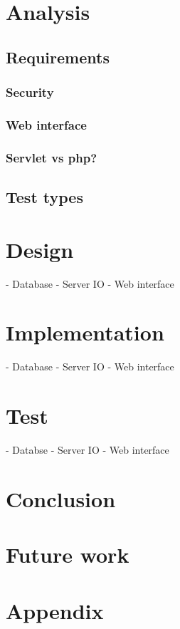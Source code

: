 



 



\chapter{Analysis}
  \section{Requirements}
    \subsection{Security}
    \subsection{Web interface}
    \subsection{Servlet vs php?}
  \section{Test types}
\chapter{Design}
  - Database
  - Server IO
  - Web interface
\chapter{Implementation}
  - Database
  - Server IO
  - Web interface
\chapter{Test}
  - Databse
  - Server IO
  - Web interface
\chapter{Conclusion}
\chapter{Future work}

\chapter*{Appendix}


